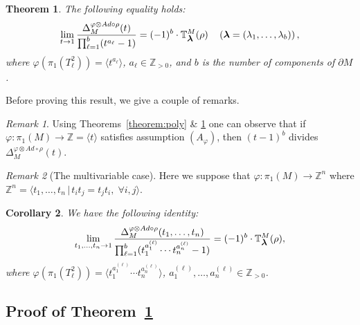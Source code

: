 \documentclass[a4paper]{amsart}
\theoremstyle{plain}
\newtheorem{theorem}{Theorem}
\newtheorem{corollary}[theorem]{Corollary}%
\theoremstyle{definition}
\theoremstyle{remark}
\newtheorem{remark}{Remark}%
\newcommand{\ZZ}{{\mathbb Z}}
\newcommand{\bm}[1]{\mbox{\boldmath $#1$}}
\newcommand{\smallbm}[1]{\mbox{\small \boldmath $#1$}}
\newcommand{\PolyTors}[2]{\Delta_{#1}^{#2}}
\newcommand{\RTors}[2]{\mathbb{T}^{#1}_{#2}}
\newcommand{\otAd}[2]{#1 \otimes Ad \circ #2}
\begin{document}
\begin{theorem}\label{theorem:polyvstorsion}
  The following equality holds:
  \begin{equation}\label{eqn:limit_formula}
    \lim_{t \to 1} 
    \frac{
      \PolyTors{M}{\otAd{\varphi}{\rho}}(t)
    }{
      \prod_{\ell = 1}^b (t^{a_\ell}-1)
    }
    = (-1)^b \cdot  \RTors{M}{\smallbm{\lambda}}(\rho)
    \quad \left(\bm{\lambda}=(\lambda_1, \ldots, \lambda_b)\right), 
  \end{equation}
  where $\varphi(\pi_1(T^2_\ell)) = \langle t^{a_\ell}\rangle$, $a_\ell
  \in \ZZ_{>0}$, and $b$ is the number of components of $\partial M$.
\end{theorem}

Before proving this result, we give a couple of remarks.

\begin{remark}
  Using Theorems~\ref{theorem:poly} \& \ref{theorem:polyvstorsion} one
  can observe that if $\varphi\colon \pi_1(M) \to \ZZ = \langle t
  \rangle$ satisfies assumption $(A_\varphi)$, then $(t-1)^b$ divides
  $\PolyTors{M}{\otAd{\varphi}{\rho}}(t)$.
\end{remark}


\begin{remark}[The multivariable case]
  Here we suppose that $\varphi\colon \pi_1(M) \to \ZZ^n$ where $\ZZ^n
  = \langle t_1, \ldots, t_n \, |\, t_i t_j = t_j t_i, \; \forall i,j
  \rangle$.
\end{remark}
	
\begin{corollary}\label{cor:DerFormula_one _variable}
  We have the following identity:
  \begin{equation}
    \lim_{t_1, \ldots, t_n \to 1} 
    \frac{
      \PolyTors{M}{\otAd{\varphi}{\rho}}(t_1, \ldots, t_n)
    }{
      \prod_{\ell = 1}^b (t_1^{a_1^{(\ell)}} \cdots t_n^{a_n^{(\ell)}} - 1)
    } 
    = (-1)^b \cdot \RTors{M}{\smallbm{\lambda}}(\rho),
  \end{equation}
  where $\varphi(\pi_1(T_\ell^2)) = \langle t_1^{a_1^{(\ell)}} \cdots
  t_n^{a_n^{(\ell)}} \rangle$, $a_1^{(\ell)}, \ldots, a_n^{(\ell)} \in \ZZ_{>0}$.
\end{corollary}




\subsection{Proof of Theorem~\ref{theorem:polyvstorsion}}
\end{document}
